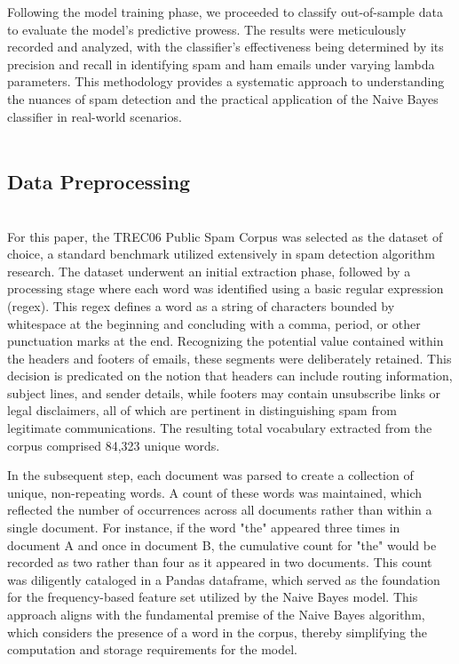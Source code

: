 \documentclass{acm_proc_article-sp}
\begin{document}
Following the model training phase, we proceeded to classify out-of-sample data to evaluate the model’s predictive prowess. The results were meticulously recorded and analyzed, with the classifier's effectiveness being determined by its precision and recall in identifying spam and ham emails under varying lambda parameters. This methodology provides a systematic approach to understanding the nuances of spam detection and the practical application of the Naive Bayes classifier in real-world scenarios.
~\\~\\
\subsection{Data Preprocessing}~\\
For this paper, the TREC06 Public Spam Corpus was selected as the dataset of choice, a standard benchmark utilized extensively in spam detection algorithm research. The dataset underwent an initial extraction phase, followed by a processing stage where each word was identified using a basic regular expression (regex). This regex defines a word as a string of characters bounded by whitespace at the beginning and concluding with a comma, period, or other punctuation marks at the end. Recognizing the potential value contained within the headers and footers of emails, these segments were deliberately retained. This decision is predicated on the notion that headers can include routing information, subject lines, and sender details, while footers may contain unsubscribe links or legal disclaimers, all of which are pertinent in distinguishing spam from legitimate communications. The resulting total vocabulary extracted from the corpus comprised 84,323 unique words.

In the subsequent step, each document was parsed to create a collection of unique, non-repeating words. A count of these words was maintained, which reflected the number of occurrences across all documents rather than within a single document. For instance, if the word "the" appeared three times in document A and once in document B, the cumulative count for "the" would be recorded as two rather than four as it appeared in two documents. This count was diligently cataloged in a Pandas dataframe, which served as the foundation for the frequency-based feature set utilized by the Naive Bayes model. This approach aligns with the fundamental premise of the Naive Bayes algorithm, which considers the presence of a word in the corpus, thereby simplifying the computation and storage requirements for the model.
\end{document}
